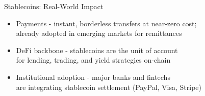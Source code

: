 \documentclass[aspectratio=169, 11pt]{beamer}
\begin{document}
\begin{frame}{Stablecoins: Real-World Impact}
  \begin{itemize}
    \setlength{\itemsep}{12pt}
    \item \textcolor{ap3orange}{Payments} - instant, borderless transfers at near-zero cost;\\
          already adopted in emerging markets for remittances
    \item \textcolor{ap3orange}{DeFi backbone} - stablecoins are the unit of account\\
          for lending, trading, and yield strategies on-chain
    \item \textcolor{ap3orange}{Institutional adoption} - major banks and fintechs\\
          are integrating stablecoin settlement (PayPal, Visa, Stripe)
  \end{itemize}

\end{frame}
\end{document}
